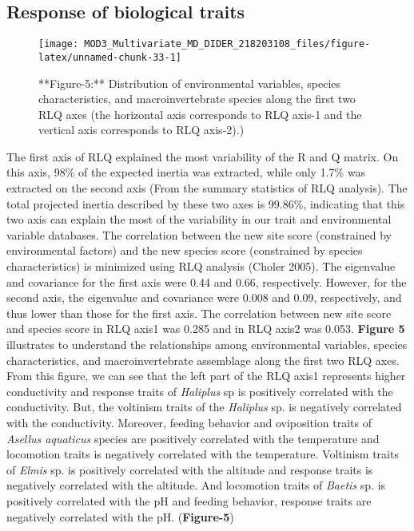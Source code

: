 \documentclass[
]{article}
\begin{document}
\hypertarget{response-of-biological-traits}{%
\subsection{Response of biological
traits}\label{response-of-biological-traits}}

\begin{figure}

{\centering \texttt{[image: MOD3\_Multivariate\_MD\_DIDER\_218203108\_files/figure-latex/unnamed-chunk-33-1]} 

}

\caption{**Figure-5:** Distribution of environmental variables, species characteristics, and macroinvertebrate species along the first two RLQ axes (the horizontal axis corresponds to RLQ axis-1 and the vertical axis corresponds to RLQ axis-2).)}\label{fig:unnamed-chunk-33}
\end{figure}

The first axis of RLQ explained the most variability of the R and Q
matrix. On this axis, 98\% of the expected inertia was extracted, while
only 1.7\% was extracted on the second axis (From the summary statistics
of RLQ analysis). The total projected inertia described by these two
axes is 99.86\%, indicating that this two axis can explain the most of
the variability in our trait and environmental variable databases. The
correlation between the new site score (constrained by environmental
factors) and the new species score (constrained by species
characteristics) is minimized using RLQ analysis (Choler 2005). The
eigenvalue and covariance for the first axis were 0.44 and 0.66,
respectively. However, for the second axis, the eigenvalue and
covariance were 0.008 and 0.09, respectively, and thus lower than those
for the first axis. The correlation between new site score and species
score in RLQ axis1 was 0.285 and in RLQ axis2 was 0.053. \textbf{Figure
5} illustrates to understand the relationships among environmental
variables, species characteristics, and macroinvertebrate assemblage
along the first two RLQ axes. From this figure, we can see that the left
part of the RLQ axis1 represents higher conductivity and response traits
of \emph{Haliplus} sp is positively correlated with the conductivity.
But, the voltinism traits of the \emph{Haliplus} sp. is negatively
correlated with the conductivity. Moreover, feeding behavior and
oviposition traits of \emph{Asellus aquaticus} species are positively
correlated with the temperature and locomotion traits is negatively
correlated with the temperature. Voltinism traits of \emph{Elmis} sp. is
positively correlated with the altitude and response traits is
negatively correlated with the altitude. And locomotion traits of
\emph{Baetis} sp. is positively correlated with the pH and feeding
behavior, response traits are negatively correlated with the pH.
(\textbf{Figure-5})
\end{document}
